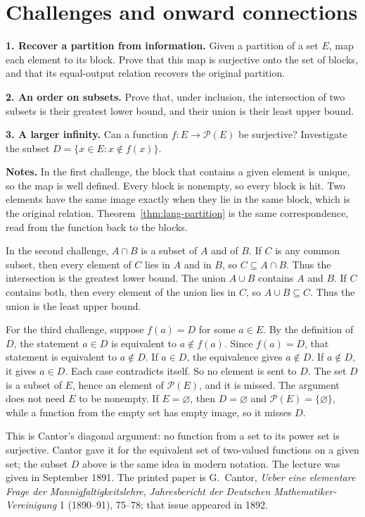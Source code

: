 \section*{Challenges and onward connections}
\begin{challenge}
\textbf{1. Recover a partition from information.} Given a partition of a set $E$, map each element to its block. Prove that this map is surjective onto the set of blocks, and that its equal-output relation recovers the original partition.
\par\smallskip
\textbf{2. An order on subsets.} Prove that, under inclusion, the intersection of two subsets is their greatest lower bound, and their union is their least upper bound.
\par\smallskip
\textbf{3. A larger infinity.} Can a function $f:E\to\mathcal P(E)$ be surjective? Investigate the subset $D=\{x\in E:x\notin f(x)\}$.
\end{challenge}

\noindent\textbf{Notes.} In the first challenge, the block that contains a given element is unique, so the map is well defined. Every block is nonempty, so every block is hit. Two elements have the same image exactly when they lie in the same block, which is the original relation. Theorem~\ref{thm:lang-partition} is the same correspondence, read from the function back to the blocks.

In the second challenge, $A\cap B$ is a subset of $A$ and of $B$. If $C$ is any common subset, then every element of $C$ lies in $A$ and in $B$, so $C\subseteq A\cap B$. Thus the intersection is the greatest lower bound. The union $A\cup B$ contains $A$ and $B$. If $C$ contains both, then every element of the union lies in $C$, so $A\cup B\subseteq C$. Thus the union is the least upper bound.

For the third challenge, suppose $f(a)=D$ for some $a\in E$. By the definition of $D$, the statement $a\in D$ is equivalent to $a\notin f(a)$. Since $f(a)=D$, that statement is equivalent to $a\notin D$. If $a\in D$, the equivalence gives $a\notin D$. If $a\notin D$, it gives $a\in D$. Each case contradicts itself. So no element is sent to $D$. The set $D$ is a subset of $E$, hence an element of $\mathcal P(E)$, and it is missed. The argument does not need $E$ to be nonempty. If $E=\varnothing$, then $D=\varnothing$ and $\mathcal P(E)=\{\varnothing\}$, while a function from the empty set has empty image, so it misses $D$.

This is Cantor's diagonal argument: no function from a set to its power set is surjective. Cantor gave it for the equivalent set of two-valued functions on a given set; the subset $D$ above is the same idea in modern notation. The lecture was given in September 1891. The printed paper is G.~Cantor, \emph{Ueber eine elementare Frage der Mannigfaltigkeitslehre}, \emph{Jahresbericht der Deutschen Mathematiker-Vereinigung} 1 (1890--91), 75--78; that issue appeared in 1892.

